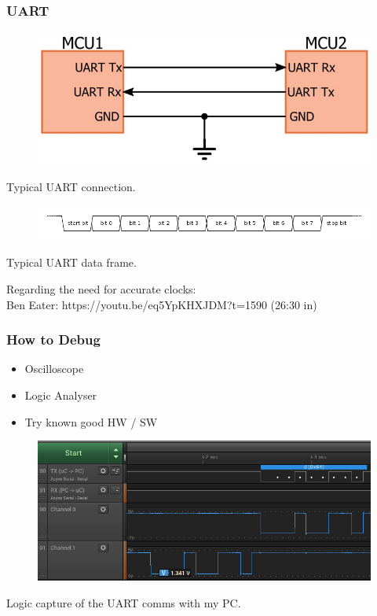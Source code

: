 \documentclass[t]{beamer}
\begin{document}

\begin{frame}[t]
\frametitle{UART}
\begin{figure}
	\includegraphics[width=0.5\linewidth]{uartConfig.jpg}
\end{figure}
\begin{center}
	Typical UART connection.
\end{center}
\begin{figure}
	\includegraphics[width=0.9\linewidth]{uartFrame.png}
\end{figure}
\begin{center}
	Typical UART data frame.
\end{center}

\vspace{3mm}
Regarding the need for accurate clocks:\\
Ben Eater: https://youtu.be/eq5YpKHXJDM?t=1590 (26:30 in)
\end{frame}


\begin{frame}[t]
\frametitle{How to Debug}
\begin{itemize}
	\item Oscilloscope
	\item Logic Analyser
	\item Try known good HW / SW
\end{itemize}
\begin{figure}
	\includegraphics[width=0.9\linewidth]{serialNotWorking.png}
\end{figure}
Logic capture of the UART comms with my PC.
\end{frame}
\end{document}
